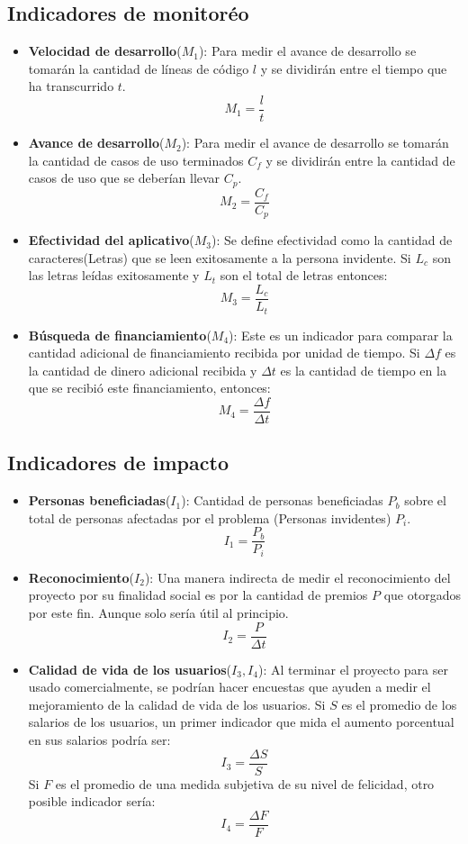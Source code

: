 \documentclass[a4paper, 12pt, oneside]{article}
\begin{document}
	\subsection{Indicadores de monitoréo}
	\begin{itemize}
		\item {\bf Velocidad de desarrollo}($M_1$): Para medir el avance de desarrollo se tomarán la cantidad
			de líneas de código $l$ y se dividirán entre el tiempo que ha transcurrido $t$.
			\[M_1 = \frac{l}{t}\]
		\item {\bf Avance de desarrollo}($M_2$): Para medir el avance de desarrollo se tomarán la cantidad
			de casos de uso terminados $C_f$ y se dividirán entre la cantidad de casos de uso que se deberían
			llevar $C_p$.
			\[M_2 = \frac{C_f}{C_p}\]
		\item {\bf Efectividad del aplicativo}($M_3$): Se define efectividad como la cantidad de caracteres(Letras)
			que se leen exitosamente a la persona invidente. Si $L_c$ son las letras leídas exitosamente y $L_t$
			son el total de letras entonces:
			\[M_3 = \frac{L_c}{L_t}\]	
		\item {\bf Búsqueda de financiamiento}($M_4$): Este es un indicador para comparar la cantidad adicional de
			financiamiento recibida por unidad de tiempo. Si $\Delta f$ es la cantidad de dinero adicional recibida
			y $\Delta t$ es la cantidad de tiempo en la que se recibió este financiamiento, entonces:
			\[M_4 = \frac{\Delta f}{\Delta t}\]
	\end{itemize}
	
	\subsection{Indicadores de impacto}

	\begin{itemize}
		\item {\bf Personas beneficiadas}($I_1$): Cantidad de personas beneficiadas $P_b$ sobre el total
			de personas afectadas por el problema (Personas invidentes) $P_i$.
			\[I_1 = \frac{P_b}{P_i}\]
		\item {\bf Reconocimiento}($I_2$): Una manera indirecta de medir el reconocimiento del proyecto por su
		 finalidad social es por la cantidad de premios $P$ que otorgados por este fin. Aunque solo sería útil
		 al principio.
			\[I_2 = \frac{P}{\Delta t}\]
		\item {\bf Calidad de vida de los usuarios}($I_3,I_4$): Al terminar el proyecto para ser usado comercialmente,
			se podrían hacer encuestas que ayuden a medir el mejoramiento de la calidad de vida de los usuarios.
			Si $S$ es el promedio de los salarios de los usuarios, un primer indicador que mida el aumento porcentual
			en sus salarios podría ser:
			\[I_3 = \frac{\Delta S}{S}\]
			Si $F$ es el promedio de una medida subjetiva de su nivel de felicidad, otro posible indicador sería:
			\[I_4 = \frac{\Delta F}{F}\]
	\end{itemize}
	
\end{document}
